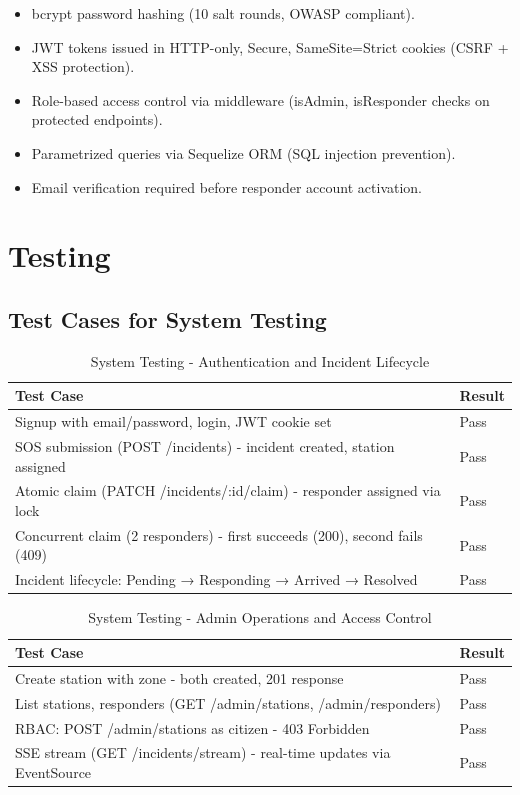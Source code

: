 \begin{itemize}
  \item bcrypt password hashing (10 salt rounds, OWASP compliant).
  \item JWT tokens issued in HTTP-only, Secure, SameSite=Strict cookies (CSRF + XSS protection).
  \item Role-based access control via middleware (isAdmin, isResponder checks on protected endpoints).
  \item Parametrized queries via Sequelize ORM (SQL injection prevention).
  \item Email verification required before responder account activation.
\end{itemize}

\section{Testing}

\subsection{Test Cases for System Testing}

\begin{table}[H]
\centering
\caption{System Testing - Authentication and Incident Lifecycle}
\begin{tabularx}{\textwidth}{|X|X|}
\hline
\textbf{Test Case} & \textbf{Result} \\
\hline
Signup with email/password, login, JWT cookie set & Pass \\
\hline
SOS submission (POST /incidents) - incident created, station assigned & Pass \\
\hline
Atomic claim (PATCH /incidents/:id/claim) - responder assigned via lock & Pass \\
\hline
Concurrent claim (2 responders) - first succeeds (200), second fails (409) & Pass \\
\hline
Incident lifecycle: Pending → Responding → Arrived → Resolved & Pass \\
\hline
\end{tabularx}
\label{tab:sys-test-auth}
\end{table}

\begin{table}[H]
\centering
\caption{System Testing - Admin Operations and Access Control}
\begin{tabularx}{\textwidth}{|X|X|}
\hline
\textbf{Test Case} & \textbf{Result} \\
\hline
Create station with zone - both created, 201 response & Pass \\
\hline
List stations, responders (GET /admin/stations, /admin/responders) & Pass \\
\hline
RBAC: POST /admin/stations as citizen - 403 Forbidden & Pass \\
\hline
SSE stream (GET /incidents/stream) - real-time updates via EventSource & Pass \\
\hline
\end{tabularx}
\label{tab:sys-test-admin}
\end{table}

